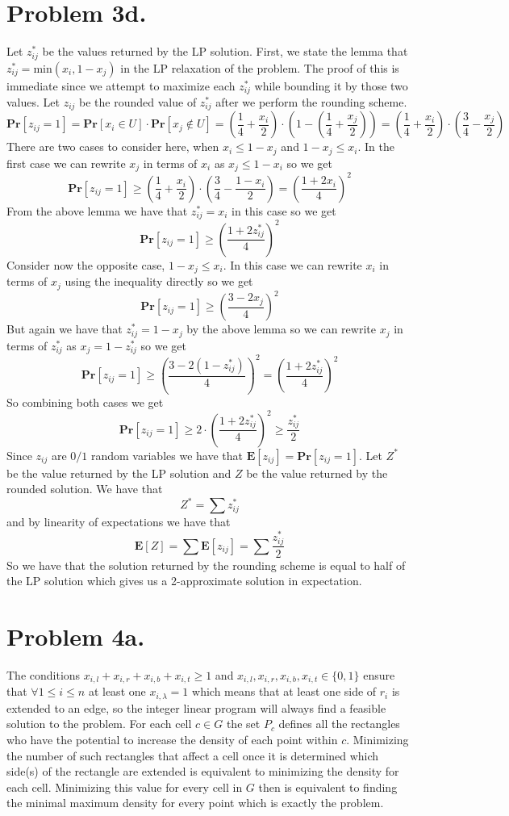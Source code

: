 \documentclass[12pt]{article}
\begin{document}
\section*{Problem 3d.}
Let $z_{ij}^*$ be the values returned by the LP solution.
First, we state the lemma that $z_{ij}^* = \text{min}(x_i, 1-x_j)$ in the
LP relaxation of the problem. The proof of this is immediate since we attempt
to maximize each $z_{ij}^*$ while bounding it by those two values.
Let $z_{ij}$ be the rounded value of $z_{ij}^*$ after we perform the rounding scheme.
$$\textbf{Pr}[z_{ij} = 1] =
\textbf{Pr}[x_i \in U]\cdot\textbf{Pr}[x_j \notin U] =
(\frac{1}{4} + \frac{x_i}{2}) \cdot (1-(\frac{1}{4} + \frac{x_j}{2})) =
(\frac{1}{4} + \frac{x_i}{2}) \cdot (\frac{3}{4} - \frac{x_j}{2})
$$
There are two cases to consider here, when $x_i \le 1-x_j$ and
$1-x_j \le x_i$. In the first case we can rewrite $x_j$ in terms of $x_i$ as
$x_j \le 1-x_i $ so we get
$$\textbf{Pr}[z_{ij} = 1] \ge 
(\frac{1}{4} + \frac{x_i}{2}) \cdot (\frac{3}{4} - \frac{1-x_i}{2}) =
\left(\frac{1+2x_i}{4}\right)^2
$$
From the above lemma we have that $z_{ij}^* = x_i$ in this case so we get
$$\textbf{Pr}[z_{ij} = 1] \ge \left(\frac{1+2z_{ij}^*}{4}\right)^2$$
Consider now the opposite case, $1-x_j \le x_i$. In this case we can rewrite
$x_i$ in terms of $x_j$ using the inequality directly so we get
$$\textbf{Pr}[z_{ij} = 1] \ge 
\left(\frac{3-2x_j}{4}\right)^2
$$
But again we have that $z_{ij}^* = 1 - x_j$ by the above lemma so we can rewrite
$x_j$ in terms of $z_{ij}^*$ as $x_j = 1 - z_{ij}^*$ so we get
$$\textbf{Pr}[z_{ij} = 1] \ge 
\left(\frac{3-2(1-z_{ij}^*)}{4}\right)^2 =
\left(\frac{1+2z_{ij}^*}{4}\right)^2
$$
So combining both cases we get
$$\textbf{Pr}[z_{ij} = 1] \ge 
2\cdot\left(\frac{1+2z_{ij}^*}{4}\right)^2 \ge
\frac{z_{ij}^*}{2}
$$
Since $z_{ij}$ are $0/1$ random variables we have that $\textbf{E}[z_{ij}] =
\textbf{Pr}[z_{ij} = 1]$. Let $Z^*$ be the value returned by the LP solution and
$Z$ be the value returned by the rounded solution. We have that
$$Z^* = \sum z_{ij}^*$$ and by linearity of expectations we have that
$$\textbf{E}[Z] = \sum \textbf{E}[z_{ij}] = \sum \frac{z_{ij}^*}{2}$$
So we have that the solution returned by the rounding scheme is equal to half of
the LP solution which gives us a 2-approximate solution in expectation.

\section*{Problem 4a.}
The conditions $x_{i,l} + x_{i,r} + x_{i,b} + x_{i,t} \ge 1$
and $x_{i,l}, x_{i,r}, x_{i,b}, x_{i,t} \in \{0,1\}$ ensure that
$\forall 1 \le i \le n$ at least one $x_{i,\lambda} = 1$ which means that at
least one side of $r_i$ is extended to an edge, so the integer linear program
will always find a feasible solution to the problem. For each cell $c \in G$ the
set $P_c$ defines all the rectangles who have the potential to increase the
density of each point within $c$. Minimizing the number of such rectangles that
affect a cell once it is determined which side(s) of the rectangle are extended
is equivalent to minimizing the density for each cell. Minimizing this value for
every cell in $G$ then is equivalent to finding the minimal maximum density for
every point which is exactly the problem.
\end{document}
